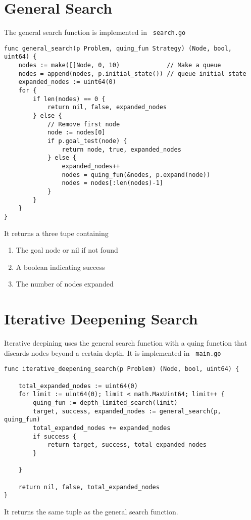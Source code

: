 \documentclass[14pt,a4paper]{report}
\begin{document}
\section{General Search}
The general search function is implemented in \verb+ search.go+
\begin{lstlisting}
func general_search(p Problem, quing_fun Strategy) (Node, bool, uint64) {
    nodes := make([]Node, 0, 10)             // Make a queue
    nodes = append(nodes, p.initial_state()) // queue initial state
    expanded_nodes := uint64(0)
    for {
        if len(nodes) == 0 {
            return nil, false, expanded_nodes
        } else {
            // Remove first node
            node := nodes[0]
            if p.goal_test(node) {
                return node, true, expanded_nodes
            } else {
                expanded_nodes++
                nodes = quing_fun(&nodes, p.expand(node))
                nodes = nodes[:len(nodes)-1]
            }
        }
    }
}
\end{lstlisting}
It returns a three tupe containing
\begin{enumerate}
\item The goal node or nil if not found
\item A boolean indicating success
\item The number of nodes expanded
\end{enumerate}
\section{Iterative Deepening Search}
Iterative deepining uses the general search function with a quing function that discards
nodes beyond a certain depth. It is implemented in \verb+ main.go +
\begin{lstlisting}
func iterative_deepening_search(p Problem) (Node, bool, uint64) {

    total_expanded_nodes := uint64(0)
    for limit := uint64(0); limit < math.MaxUint64; limit++ {
        quing_fun := depth_limited_search(limit)
        target, success, expanded_nodes := general_search(p, quing_fun)
        total_expanded_nodes += expanded_nodes
        if success {
            return target, success, total_expanded_nodes
        }

    }

    return nil, false, total_expanded_nodes
}
\end{lstlisting}

It returns the same tuple as the general search function.
\end{document}
